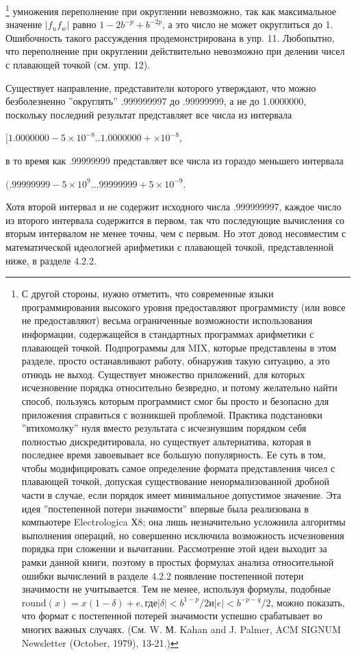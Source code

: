 \begin{enumerate}
\footnote{С другой стороны, нужно отметить, что современные языки программирования высокого уровня предоставляют программисту (или вовсе не предоставляют) весьма ограниченные возможности использования информации, содержащейся в стандартных программах арифметики с плавающей точкой. Подпрограммы для MIX, которые представлены в этом разделе, просто останавливают работу, обнаружив такую ситуацию, а это отнюдь не выход. Существует множество приложений, для которых исчезновение порядка относительно безвредно, и потому желательно найти способ, пользуясь которым программист смог бы просто и безопасно для приложения справиться с возникшей проблемой. Практика подстановки ''втихомолку'' нуля вместо результата с исчезнувшим порядком себя полностью дискредитировала, но существует альтернатива, которая в последнее время завоевывает все большую популярность. Ее суть в том, чтобы модифицировать самое определение формата представления чисел с плавающей точкой, допуская существование ненормализованной дробной части в случае, если порядок имеет минимальное допустимое значение. Эта идея ''постепенной потери значимости'' впервые была реализована в компьютере Electrologica Х8; она лишь незначительно усложнила алгоритмы выполнения операций, но совершенно исключила возможность исчезновения порядка при сложении и вычитании. Рассмотрение этой идеи выходит за рамки данной книги, поэтому в простых формулах анализа относительной ошибки вычислений в разделе 4.2.2 появление постепенной потери значимости не учитывается. Тем не менее, используя формулы, подобные $\text{round}(x)= x(1 - \delta) + e, \text{где} |\delta | < b^{1-p}/2 \text{и} |e| < b^{-p-q}/2$, можно показать, что формат с постепенной потерей значимости успешно срабатывает во многих важных случаях. (См. W. М. Kahan and J. Palmer, ACM SIGNUM Newsletter (October, 1979), 13-21.)}
умножения переполнение при округлении невозможно, так как максимальное значение $|f_{u}f_{w}|$ равно $1- 2b^{-p} + b^{-2p}$, а это число не может округлиться до 1. Ошибочность такого рассуждения продемонстрирована в упр. 11. Любопытно, что переполнение при округлении действительно невозможно при делении чисел с плавающей точкой (см. упр. 12).

Существует направление, представители которого утверждают, что можно безболезненно ''округлять'' .999999997 до .99999999, а не до 1.0000000, поскольку последний результат представляет все числа из интервала
\begin{center}
$[1.0000000 - 5 \times 10^{-8} .. 1.0000000 + \times 10^{-8}$,
\end{center}
в то время как .99999999 представляет все числа из гораздо меньшего интервала
\begin{center} 
$(.99999999 - 5 \times 10^{9} .. .99999999 + 5 \times 10^{-9}$.
\end{center}
Хотя второй интервал и не содержит исходного числа .999999997, каждое число из второго интервала содержится в первом, так что последующие вычисления со вторым интервалом не менее точны, чем с первым. Но этот довод несовместим с математической идеологией арифметики с плавающей точкой, представленной ниже, в разделе 4.2.2.
 

\end{enumerate}
